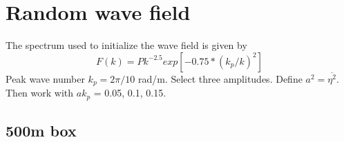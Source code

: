 \documentclass{article}
\begin{document}
\section{Random wave field}
The spectrum used to initialize the wave field is given by 
\begin{equation}
    F(k) = Pk^{-2.5}exp[-0.75*(k_p/k)^2]
\end{equation}
Peak wave number $k_p=2\pi/10$ rad/m. Select three amplitudes. Define $a^2 = \overline{\eta^2}$. Then work with $ak_p$ = 0.05, 0.1, 0.15.

\subsection{500m box}




  
\begin{thebibliography}{1}
\end{thebibliography}
\end{document}

